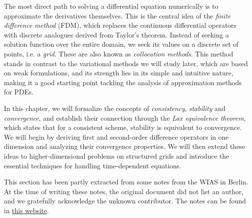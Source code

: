 The most direct path to solving a differential equation numerically is to approximate the derivatives themselves. This is the central idea of the \emph{finite difference method} (FDM), which replaces the continuous differential operators with discrete analogues derived from Taylor's theorem. Instead of seeking a solution function over the entire domain, we seek its values on a discrete set of points, i.e. a \emph{grid}. These are also known as \emph{collocation methods}. This method stands in contrast to the variational methods we will study later, which are based on weak formulations, and its strength lies in its simple and intuitive nature, making it a good starting point tackling the analysis of approximation methods for PDEs. 

In this chapter, we will formalize the concepts of \emph{consistency}, \emph{stability} and \emph{convergence}, and establish their connection through the \emph{Lax equivalence theorem}, which states that for a consistent scheme, stability is equivalent to convergence. We will begin by deriving first and second-order difference operators in one dimension and analyzing their convergence properties. We will then extend these ideas to higher-dimensional problems on structured grids and introduce the essential techniques for handling time-dependent equations.

This section has been partly extracted from some notes from the WIAS in Berlin. At the time of writing these notes, the original document did not list an author, and we gratefully acknowledge the unknown contributor. The notes can be found in \href{https://www.wias-berlin.de/people/john/LEHRE/NUMERIK\_IV\_21\_22/num\_konv\_dom\_prob\_3.pdf}{this website}.

